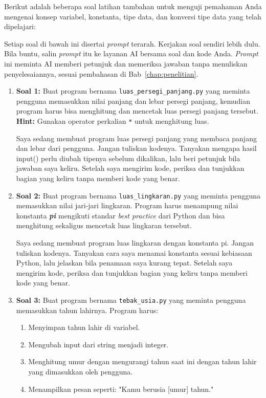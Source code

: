 Berikut adalah beberapa soal latihan tambahan untuk menguji pemahaman Anda mengenai konsep variabel, konstanta, tipe data, dan konversi tipe data yang telah dipelajari:

Setiap soal di bawah ini disertai \textit{prompt} terarah. Kerjakan soal sendiri lebih dulu. Bila buntu, salin \textit{prompt} itu ke layanan AI bersama soal dan kode Anda. \textit{Prompt} ini meminta AI memberi petunjuk dan memeriksa jawaban tanpa menuliskan penyelesaiannya, sesuai pembahasan di Bab~\ref{chap:penelitian}.

\begin{enumerate}
\item \textbf{Soal 1:} Buat program bernama \texttt{luas_persegi_panjang.py} yang meminta pengguna memasukkan nilai panjang dan lebar persegi panjang, kemudian program harus bisa menghitung dan mencetak luas persegi panjang tersebut.
\newline \newline
\textbf{Hint:} Gunakan operator perkalian \texttt{*} untuk menghitung luas.

  \begin{promptterarah}
  Saya sedang membuat program luas persegi panjang yang membaca panjang dan lebar dari pengguna. Jangan tuliskan kodenya. Tanyakan mengapa hasil input() perlu diubah tipenya sebelum dikalikan, lalu beri petunjuk bila jawaban saya keliru. Setelah saya mengirim kode, periksa dan tunjukkan bagian yang keliru tanpa memberi kode yang benar.
  \end{promptterarah}
\item \textbf{Soal 2:} Buat program bernama \texttt{luas_lingkaran.py} yang meminta pengguna memasukkan nilai jari-jari lingkaran. Program harus menampung nilai konstanta \textbf{\textit{pi}} mengikuti standar \textit{best practice} dari Python dan bisa menghitung sekaligus mencetak luas lingkaran tersebut.

  \begin{promptterarah}
  Saya sedang membuat program luas lingkaran dengan konstanta pi. Jangan tuliskan kodenya. Tanyakan cara saya menamai konstanta sesuai kebiasaan Python, lalu jelaskan bila penamaan saya kurang tepat. Setelah saya mengirim kode, periksa dan tunjukkan bagian yang keliru tanpa memberi kode yang benar.
  \end{promptterarah}
\item \textbf{Soal 3:} Buat program bernama \texttt{tebak_usia.py} yang meminta pengguna memasukkan tahun lahirnya. Program harus:
\begin{enumerate}
    \item Menyimpan tahun lahir di variabel.
    \item Mengubah input dari string menjadi integer.
    \item Menghitung umur dengan mengurangi tahun saat ini dengan tahun lahir yang dimasukkan oleh pengguna.
    \item Menampilkan pesan seperti: "Kamu berusia [umur] tahun."
\end{enumerate}


\end{enumerate}
